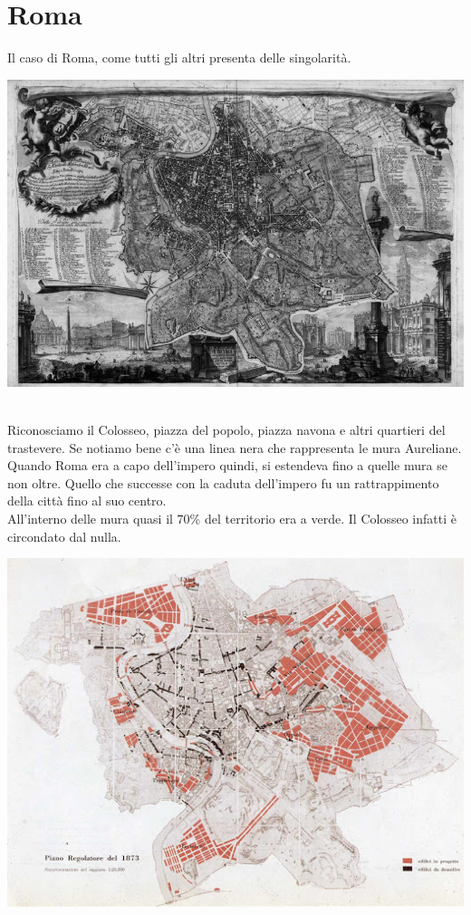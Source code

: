\documentclass[a4paper,12pt, oneside]{book}
\begin{document}
  \section{Roma}
  Il caso di Roma, come tutti gli altri presenta delle singolarità. 
  \begin{center}
  	\includegraphics[width=0.6\linewidth]{"immagini/Nuova-pianta-di-Roma-by-GB-Nolli-1748"}
  	\label{fig:roma cartina}
  \end{center}
  \leavevmode\\
  Riconosciamo il Colosseo, piazza del popolo, piazza navona e altri quartieri del trastevere. Se notiamo bene c'è una linea nera che rappresenta le mura Aureliane.\\
  Quando Roma era a capo dell'impero quindi, si estendeva fino a quelle mura se non oltre. Quello che successe con la caduta dell'impero fu un rattrappimento della città fino al suo centro.\\
  All'interno delle mura quasi il 70\% del territorio era a verde. Il Colosseo infatti è circondato dal nulla.\\
  \begin{center}
  	\includegraphics[width=0.6\linewidth]{"immagini/piano regolare roma 1873"}
  	\label{fig:piano regolare roma 1873}
  \end{center}
  \leavevmode\\
\end{document}
